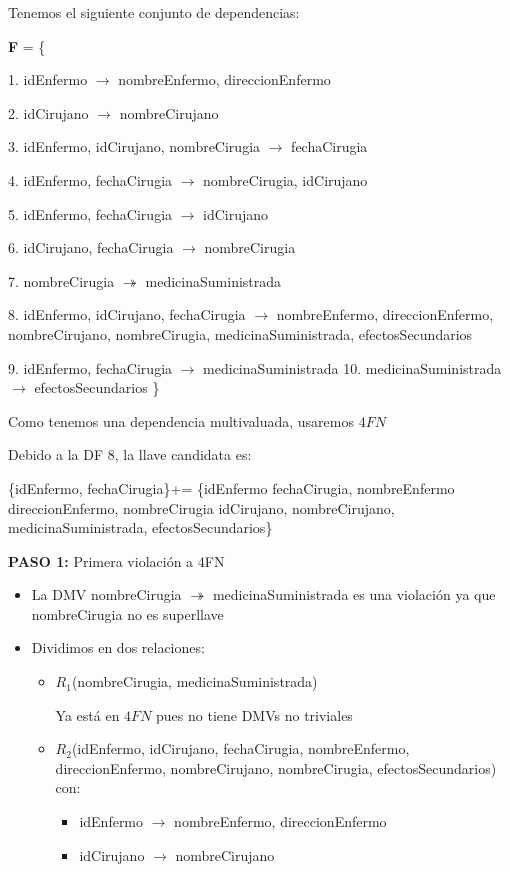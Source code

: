 \begin{itemize}
    Tenemos el siguiente conjunto de dependencias:

    \textbf{F} = \{
    
    1. idEnfermo $\rightarrow$ nombreEnfermo, direccionEnfermo
    
    2. idCirujano $\rightarrow$ nombreCirujano
    
    3. idEnfermo, idCirujano, nombreCirugia $\rightarrow$ fechaCirugia
    
    4. idEnfermo, fechaCirugia $\rightarrow$ nombreCirugia, idCirujano
    
    5. idEnfermo, fechaCirugia $\rightarrow$ idCirujano
    
    6. idCirujano, fechaCirugia $\rightarrow$ nombreCirugia
    
    7. nombreCirugia $\twoheadrightarrow$ medicinaSuministrada
    
    8. idEnfermo, idCirujano, fechaCirugia $\rightarrow$ nombreEnfermo, direccionEnfermo, nombreCirujano, nombreCirugia, medicinaSuministrada, efectosSecundarios
    
    9. idEnfermo, fechaCirugia $\rightarrow$ medicinaSuministrada
    10. medicinaSuministrada $\rightarrow$ efectosSecundarios
\}

Como tenemos una dependencia multivaluada, usaremos $4FN$

Debido a la DF 8, la llave candidata es:

\{idEnfermo, fechaCirugia\}+=
\{idEnfermo fechaCirugia, nombreEnfermo direccionEnfermo, nombreCirugia idCirujano, nombreCirujano, medicinaSuministrada, efectosSecundarios\}


\textbf{PASO 1:} Primera violación a 4FN
\begin{itemize}
    \item La DMV nombreCirugia $\twoheadrightarrow$ medicinaSuministrada es una violación ya que nombreCirugia no es superllave
    
    \item Dividimos en dos relaciones:
    \begin{itemize}[label=\textcolor{magenta}{$\bigstar$}]
        \item $R_1$(nombreCirugia, medicinaSuministrada) 
        
        Ya está en $4FN$ pues no tiene DMVs no triviales
        \item $R_2$(idEnfermo, idCirujano, fechaCirugia, nombreEnfermo, direccionEnfermo, nombreCirujano, nombreCirugia, efectosSecundarios) con:
        \begin{itemize}
            \item idEnfermo $\rightarrow$ nombreEnfermo, direccionEnfermo
            \item idCirujano $\rightarrow$ nombreCirujano
            

\end{itemize}
\end{itemize}
\end{itemize}
\end{itemize}
